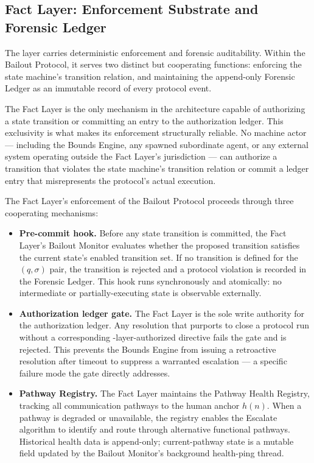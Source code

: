 \subsection{Fact Layer: Enforcement Substrate and Forensic Ledger}\label{sec:fact-layer}

The \fact{} layer carries deterministic enforcement and forensic auditability. Within the Bailout Protocol, it serves two distinct but cooperating functions: enforcing the state machine's transition relation, and maintaining the append-only Forensic Ledger as an immutable record of every protocol event.

The Fact Layer is the only mechanism in the \bxthree{} architecture capable of authorizing a state transition or committing an entry to the authorization ledger. This exclusivity is what makes its enforcement structurally reliable. No machine actor — including the Bounds Engine, any spawned subordinate agent, or any external system operating outside the Fact Layer's jurisdiction — can authorize a transition that violates the state machine's transition relation or commit a ledger entry that misrepresents the protocol's actual execution.

The Fact Layer's enforcement of the Bailout Protocol proceeds through three cooperating mechanisms:

\begin{itemize}\itemsep=0pt
\item[(\textit{i})] \textbf{Pre-commit hook.} Before any state transition is committed, the Fact Layer's Bailout Monitor evaluates whether the proposed transition satisfies the current state's enabled transition set. If no transition is defined for the $(q, \sigma)$ pair, the transition is rejected and a protocol violation is recorded in the Forensic Ledger. This hook runs synchronously and atomically: no intermediate or partially-executing state is observable externally.

\item[(\textit{ii})] \textbf{Authorization ledger gate.} The Fact Layer is the sole write authority for the authorization ledger. Any resolution that purports to close a protocol run without a corresponding \purpose-layer-authorized directive fails the gate and is rejected. This prevents the Bounds Engine from issuing a retroactive resolution after timeout to suppress a warranted escalation — a specific failure mode the gate directly addresses.

\item[(\textit{iii})] \textbf{Pathway Registry.} The Fact Layer maintains the Pathway Health Registry, tracking all communication pathways to the human anchor $h(n)$. When a pathway is degraded or unavailable, the registry enables the Escalate algorithm to identify and route through alternative functional pathways. Historical health data is append-only; current-pathway state is a mutable field updated by the Bailout Monitor's background health-ping thread.
\end{itemize}

